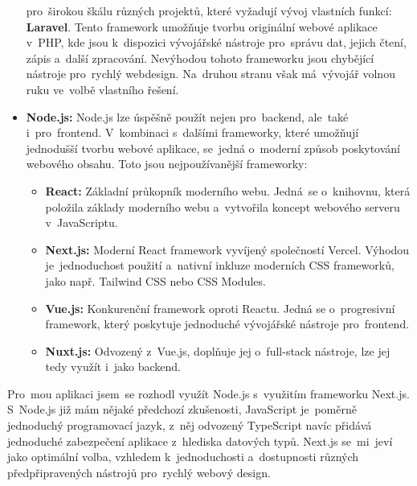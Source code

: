 \begin{itemize}
        pro~širokou škálu různých projektů, které vyžadují vývoj vlastních
        funkcí: \textbf{Laravel}. Tento framework umožňuje tvorbu originální
        webové aplikace v~PHP, kde jsou k~dispozici vývojářské nástroje
        pro~správu dat, jejich čtení, zápis a~další zpracování. Nevýhodou
        tohoto frameworku jsou chybějící nástroje pro~rychlý webdesign.
        Na~druhou stranu však má~vývojář volnou ruku ve~volbě vlastního
        řešení.
    \item \textbf{Node.js:} Node.js lze úspěšně použít nejen pro~backend,
        ale~také i~pro~frontend. V~kombinaci s~dalšími frameworky, které
        umožňují jednodušší tvorbu webové aplikace, se~jedná o~moderní
        způsob poskytování webového obsahu. Toto jsou nejpoužívanější
        frameworky:

        \begin{itemize}
            \item \textbf{React:} Základní průkopník moderního webu.
                Jedná~se o~knihovnu, která položila základy moderního
                webu a~vytvořila koncept webového serveru v~JavaScriptu.
            \item \textbf{Next.js:} Moderní React framework vyvíjený
                společností Vercel. Výhodou je~jednoduchost použití
                a~nativní inkluze moderních CSS frameworků, jako např.
                Tailwind CSS nebo CSS Modules.
            \item \textbf{Vue.js:} Konkurenční framework oproti Reactu.
                Jedná se o~progresivní framework, který poskytuje jednoduché
                vývojářské nástroje pro~frontend.
            \item \textbf{Nuxt.js:} Odvozený z~Vue.js, doplňuje jej
                o~full-stack nástroje, lze jej tedy využít i~jako backend.
        \end{itemize}
\end{itemize}

Pro~mou aplikaci jsem~se rozhodl využít Node.js s~využitím frameworku Next.js.
S~Node.js již mám nějaké předchozí zkušenosti, JavaScript je~poměrně
jednoduchý programovací jazyk, z~něj odvozený TypeScript navíc přidává
jednoduché zabezpečení aplikace z~hlediska datových typů. Next.js se~mi~jeví
jako optimální volba, vzhledem k~jednoduchosti a~dostupnosti různých
předpřipravených nástrojů pro~rychlý webový design.

\endinput
